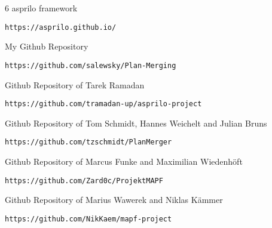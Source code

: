 \documentclass[runningheads]{llncs}
\begin{document}
\begin{thebibliography} {6}
asprilo framework
\begin{verbatim}
https://asprilo.github.io/
\end{verbatim}

My Github Repository
\begin{verbatim}
https://github.com/salewsky/Plan-Merging
\end{verbatim}

Github Repository of Tarek Ramadan
\begin{verbatim}
https://github.com/tramadan-up/asprilo-project
\end{verbatim}

Github Repository of Tom Schmidt, Hannes Weichelt and Julian Bruns
\begin{verbatim}
https://github.com/tzschmidt/PlanMerger
\end{verbatim}

Github Repository of Marcus Funke and Maximilian Wiedenhöft
\begin{verbatim}
https://github.com/Zard0c/ProjektMAPF
\end{verbatim}

Github Repository of Marius Wawerek and Niklas Kämmer
\begin{verbatim}
https://github.com/NikKaem/mapf-project
\end{verbatim}

\end{thebibliography}
\end{document}
